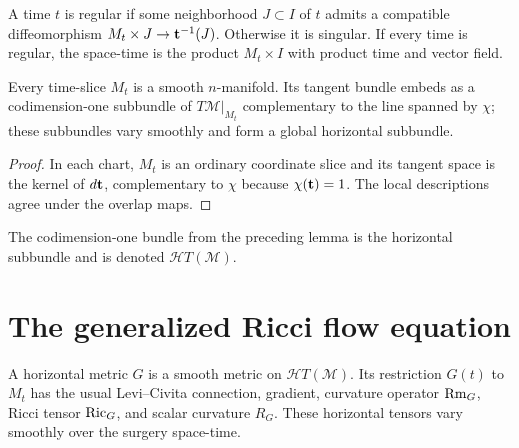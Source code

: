 \begin{definition}
\label{def:regular-singular-time-surgery}

A time $t$ is regular if some neighborhood $J\subset I$ of $t$ admits a
compatible diffeomorphism $M_t\times J\to{\bf t}^{-1}(J)$. Otherwise it is
singular. If every time is regular, the space-time is the product
$M_t\times I$ with product time and vector field.
\end{definition}

\begin{lemma}
\label{lem:time-slice-smooth-manifold}

Every time-slice $M_t$ is a smooth $n$-manifold. Its tangent bundle embeds as a
codimension-one subbundle of $T{\mathcal M}|_{M_t}$ complementary to the line
spanned by $\chi$; these subbundles vary smoothly and form a global horizontal
subbundle.
\end{lemma}

\begin{proof}
\sketch
In each chart, $M_t$ is an ordinary coordinate slice and its tangent space is
the kernel of $d{\bf t}$, complementary to $\chi$ because
$\chi({\bf t})=1$. The local descriptions agree under the overlap maps.
\end{proof}

\begin{definition}
\label{def:horizontal-subbundle}

The codimension-one bundle from the preceding lemma is the horizontal
subbundle and is denoted ${\mathcal HT}({\mathcal M})$.
\end{definition}

\section{The generalized Ricci flow equation}

\begin{definition}
\label{def:horizontal-metric}

A horizontal metric $G$ is a smooth metric on
${\mathcal HT}({\mathcal M})$. Its restriction $G(t)$ to $M_t$ has the usual
Levi--Civita connection, gradient, curvature operator $\operatorname{Rm}_G$, Ricci tensor
$\operatorname{Ric}_G$, and scalar curvature $R_G$. These horizontal tensors vary smoothly
over the surgery space-time.
\end{definition}

